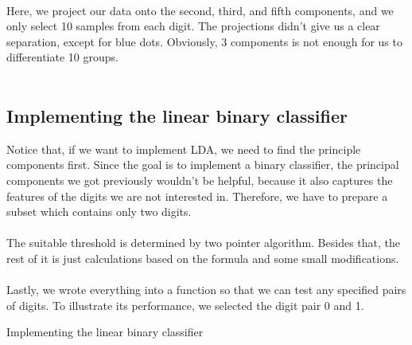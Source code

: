 \documentclass{article}
\begin{document}
~\\
Here, we project our data onto the second, third, and fifth components, and we only select 10 samples from each digit. The projections didn't give us a clear separation, except for blue dots. Obviously, 3 components is not enough for us to differentiate 10 groups.\\
~\\

\newpage
\subsection{Implementing the linear binary classifier}
Notice that, if we want to implement LDA, we need to find the principle components first. Since the goal is to implement a binary classifier, the principal components we got previously wouldn't be helpful, because it also captures the features of the digits we are not interested in. Therefore, we have to prepare a subset which contains only two digits. \\
~\\
The suitable threshold is determined by two pointer algorithm. Besides that, the rest of it is just calculations based on the formula and some small modifications. \\
~\\
Lastly, we wrote everything into a function so that we can test any specified pairs of digits. To illustrate its performance, we selected the digit pair 0 and 1.
\begin{algorithm}
\begin{algorithmic}
    \ENDIF
\end{algorithmic}
\caption{Implementing the linear binary classifier}
\end{algorithm}
\end{document}

